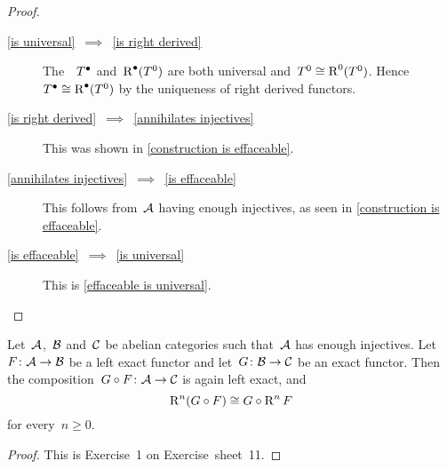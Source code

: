\begin{proof}
  \leavevmode
  \begin{description}
    \item[\ref*{is universal}~$\implies$~\ref*{is right derived}]
      The~{\deltafuns}~$T^\bullet$ and~$\operatorname{R}^\bullet (T^0)$ are both universal and~$T^0 \cong \operatorname{R}^0 (T^0)$.
      Hence~$T^\bullet \cong \operatorname{R}^\bullet (T^0)$ by the uniqueness of right derived functors.
    \item[\ref*{is right derived}~$\implies$~\ref*{annihilates injectives}]
      This was shown in \cref{construction is effaceable}.
    \item[\ref*{annihilates injectives}~$\implies$~\ref*{is effaceable}]
      This follows from~$\mathcal{A}$ having enough injectives, as seen in \cref{construction is effaceable}.
    \item[\ref*{is effaceable}~$\implies$~\ref*{is universal}]
      This is \cref{effaceable is universal}.
    \qedhere
  \end{description}
\end{proof}


\begin{lemma*}
  \label{exact functors respect derived}
  Let~$\mathcal{A}$,~$\mathcal{B}$ and~$\mathcal{C}$ be abelian categories such that~$\mathcal{A}$ has enough injectives.
  Let~$F \colon \mathcal{A} \to \mathcal{B}$ be a left exact functor and let~$G \colon \mathcal{B} \to \mathcal{C}$ be an exact functor.
  Then the composition~$G \circ F \colon \mathcal{A} \to \mathcal{C}$ is again left exact, and
  \[
    \operatorname{R}^n (G \circ F)
    \cong
    G \circ \operatorname{R}^n F
  \]
  for every~$n \geq 0$.
\end{lemma*}


\begin{proof}
  This is Exercise~1 on Exercise~sheet~11.
\end{proof}










